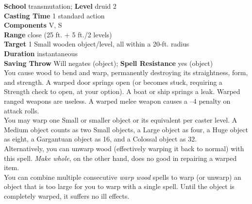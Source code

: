 \textbf{School} transmutation; \textbf{Level} druid 2\\
\textbf{Casting Time} 1 standard action\\
\textbf{Components} V, S\\
\textbf{Range} close (25 ft. + 5 ft./2 levels)\\
\textbf{Target} 1 Small wooden object/level, all within a 20-ft. radius\\
\textbf{Duration} instantaneous\\
\textbf{Saving Throw }Will negates (object); \textbf{Spell Resistance} yes (object)\\
You cause wood to bend and warp, permanently destroying its straightness, form, and strength. A warped door springs open (or becomes stuck, requiring a Strength check to open, at your option). A boat or ship springs a leak. Warped ranged weapons are useless. A warped melee weapon causes a –4 penalty on attack rolls.\\
You may warp one Small or smaller object or its equivalent per caster level. A Medium object counts as two Small objects, a Large object as four, a Huge object as eight, a Gargantuan object as 16, and a Colossal object as 32.\\
Alternatively, you can unwarp wood (effectively warping it back to normal) with this spell. \textit{Make whole}, on the other hand, does no good in repairing a warped item.\\
You can combine multiple consecutive \textit{warp wood }spells to warp (or unwarp) an object that is too large for you to warp with a single spell. Until the object is completely warped, it suffers no ill effects.\\

